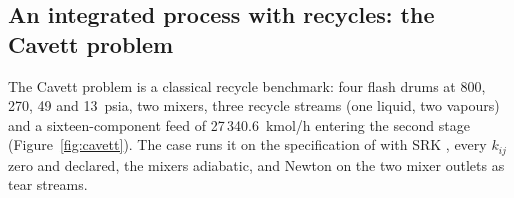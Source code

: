 \documentclass[preprint,12pt]{elsarticle}
\begin{document}
\subsection{An integrated process with recycles: the Cavett problem}
\label{sec:ex-recycle}

The Cavett problem \citep{cavett1963} is a classical recycle benchmark:
four flash drums at 800, 270, 49 and 13~psia, two mixers, three recycle
streams (one liquid, two vapours) and a sixteen-component feed of
27\,340.6~kmol/h entering the second stage (Figure~\ref{fig:cavett}).  The
case runs it on the specification of \citet{rosen1977} with SRK
\citep{soave1972}, every $k_{ij}$ zero and declared, the mixers adiabatic,
and Newton on the two mixer outlets as tear streams.
\end{document}
